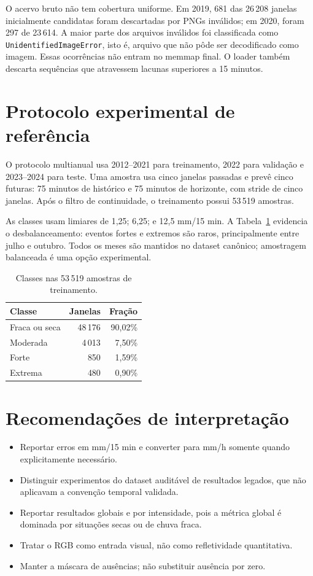 \documentclass[11pt,a4paper]{article}
\begin{document}
O acervo bruto não tem cobertura uniforme. Em 2019, 681 das 26\,208 janelas inicialmente candidatas foram descartadas por PNGs inválidos; em 2020, foram 297 de 23\,614. A maior parte dos arquivos inválidos foi classificada como \texttt{UnidentifiedImageError}, isto é, arquivo que não pôde ser decodificado como imagem. Essas ocorrências não entram no memmap final. O loader também descarta sequências que atravessem lacunas superiores a 15 minutos.

\section{Protocolo experimental de referência}
O protocolo multianual usa 2012--2021 para treinamento, 2022 para validação e 2023--2024 para teste. Uma amostra usa cinco janelas passadas e prevê cinco futuras: 75 minutos de histórico e 75 minutos de horizonte, com stride de cinco janelas. Após o filtro de continuidade, o treinamento possui 53\,519 amostras.

As classes usam limiares de 1,25; 6,25; e 12,5 mm/15 min. A Tabela~\ref{tab:classes} evidencia o desbalanceamento: eventos fortes e extremos são raros, principalmente entre julho e outubro. Todos os meses são mantidos no dataset canônico; amostragem balanceada é uma opção experimental.

\begin{table}[htbp]
\centering
\caption{Classes nas 53\,519 amostras de treinamento.}
\label{tab:classes}
\begin{tabular}{lrr}
\toprule
Classe & Janelas & Fração \\
\midrule
Fraca ou seca & 48\,176 & 90,02\% \\
Moderada & 4\,013 & 7,50\% \\
Forte & 850 & 1,59\% \\
Extrema & 480 & 0,90\% \\
\bottomrule
\end{tabular}
\end{table}

\section{Recomendações de interpretação}
\begin{itemize}
\item Reportar erros em mm/15 min e converter para mm/h somente quando explicitamente necessário.
\item Distinguir experimentos do dataset auditável de resultados legados, que não aplicavam a convenção temporal validada.
\item Reportar resultados globais e por intensidade, pois a métrica global é dominada por situações secas ou de chuva fraca.
\item Tratar o RGB como entrada visual, não como refletividade quantitativa.
\item Manter a máscara de ausências; não substituir ausência por zero.
\end{itemize}
\end{document}
